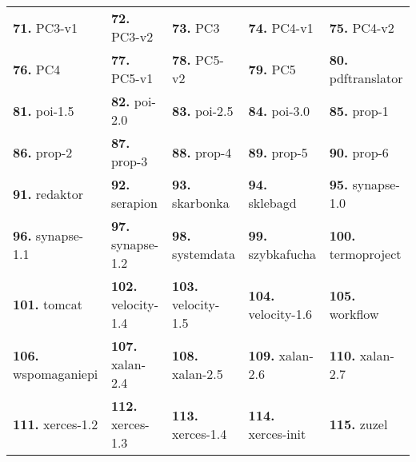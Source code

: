 \begin{table*}[!htbp]
\begin{tabular*}{\textwidth}{@{\extracolsep{\fill}} lllll}
\textbf{71.} PC3-v1 & \textbf{72.} PC3-v2 & \textbf{73.} PC3 & \textbf{74.} PC4-v1 & \textbf{75.} PC4-v2    \\
\textbf{76.} PC4 & \textbf{77.} PC5-v1 & \textbf{78.} PC5-v2 & \textbf{79.} PC5 & \textbf{80.} pdftranslator    \\
\textbf{81.} poi-1.5 & \textbf{82.} poi-2.0 & \textbf{83.} poi-2.5 & \textbf{84.} poi-3.0 & \textbf{85.} prop-1    \\
\textbf{86.} prop-2 & \textbf{87.} prop-3 & \textbf{88.} prop-4 & \textbf{89.} prop-5 & \textbf{90.} prop-6    \\
\textbf{91.} redaktor & \textbf{92.} serapion & \textbf{93.} skarbonka & \textbf{94.} sklebagd & \textbf{95.} synapse-1.0    \\
\textbf{96.} synapse-1.1 & \textbf{97.} synapse-1.2 & \textbf{98.} systemdata & \textbf{99.} szybkafucha & \textbf{100.} termoproject    \\
\textbf{101.} tomcat & \textbf{102.} velocity-1.4 & \textbf{103.} velocity-1.5 & \textbf{104.} velocity-1.6 & \textbf{105.} workflow    \\
\textbf{106.} wspomaganiepi & \textbf{107.} xalan-2.4 & \textbf{108.} xalan-2.5 & \textbf{109.} xalan-2.6 & \textbf{110.} xalan-2.7    \\
\textbf{111.} xerces-1.2 & \textbf{112.} xerces-1.3 & \textbf{113.} xerces-1.4 & \textbf{114.} xerces-init & \textbf{115.} zuzel    \\
\bottomrule
\end{tabular*}
\end{table*}